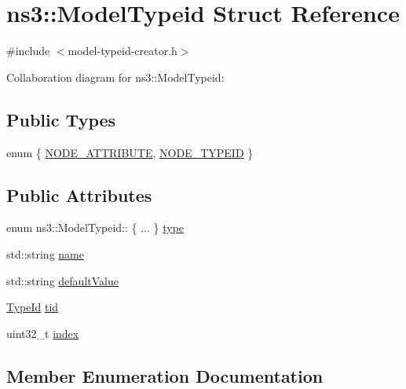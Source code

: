 \hypertarget{structns3_1_1ModelTypeid}{}\section{ns3\+:\+:Model\+Typeid Struct Reference}
\label{structns3_1_1ModelTypeid}


{\ttfamily \#include $<$model-\/typeid-\/creator.\+h$>$}



Collaboration diagram for ns3\+:\+:Model\+Typeid\+:
\subsection*{Public Types}
\begin{DoxyCompactItemize}
\item 
enum \{ \hyperlink{structns3_1_1ModelTypeid_a1391843d250501865d73d8959311d26daf70ab21537cd64273500d90f217282fa}{N\+O\+D\+E\+\_\+\+A\+T\+T\+R\+I\+B\+U\+TE}, 
\hyperlink{structns3_1_1ModelTypeid_a1391843d250501865d73d8959311d26da529a142471ba6c43af4f730690e68cff}{N\+O\+D\+E\+\_\+\+T\+Y\+P\+E\+ID}
 \}
\end{DoxyCompactItemize}
\subsection*{Public Attributes}
\begin{DoxyCompactItemize}
\item 
enum ns3\+::\+Model\+Typeid\+:: \{ ... \}  \hyperlink{structns3_1_1ModelTypeid_adee7e974876ae40c73f6a7faa509aa09}{type}
\item 
std\+::string \hyperlink{structns3_1_1ModelTypeid_af1e4deab2ad1fd1688e9e561f92f02b2}{name}
\item 
std\+::string \hyperlink{structns3_1_1ModelTypeid_aab55450e449461d95e145179eba2715b}{default\+Value}
\item 
\hyperlink{classns3_1_1TypeId}{Type\+Id} \hyperlink{structns3_1_1ModelTypeid_a14c5f367bb4ad7b9cd91b497296b5d82}{tid}
\item 
uint32\+\_\+t \hyperlink{structns3_1_1ModelTypeid_a0e95da0e21c60b28dcaaf1744abfb618}{index}
\end{DoxyCompactItemize}


\subsection{Member Enumeration Documentation}

